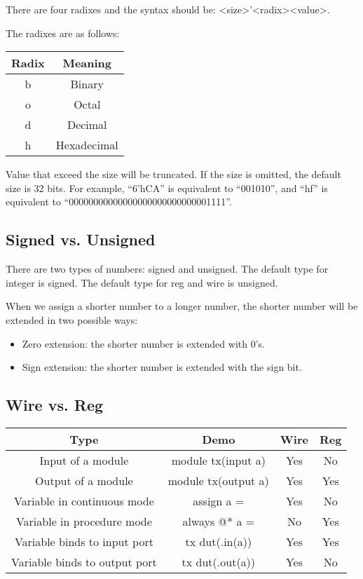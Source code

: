 \documentclass[a4paper,12pt]{article}
\begin{document}
There are four radixes and the syntax should be: <size>'<radix><value>.

The radixes are as follows:
\begin{center}
	\begin{tabular}{cc}
		\toprule
		Radix & Meaning \\
		\midrule
		b & Binary \\
		o & Octal \\
		d & Decimal \\
		h & Hexadecimal \\
		\bottomrule
	\end{tabular}
\end{center}

Value that exceed the size will be truncated.
If the size is omitted, the default size is 32 bits.
For example, ``6’hCA'' is equivalent to ``001010'', and ``hf'' is equivalent to ``00000000000000000000000000001111''.

\subsection{Signed vs. Unsigned}

There are two types of numbers: signed and unsigned.
The default type for integer is signed.
The default type for reg and wire is unsigned.

When we assign a shorter number to a longer number, the shorter number will be extended in two possible ways:
\begin{itemize}
	\item Zero extension: the shorter number is extended with 0's.
	\item Sign extension: the shorter number is extended with the sign bit.
\end{itemize}

\subsection{Wire vs. Reg}

\begin{center}
	\begin{tabular}{cccc}
		\toprule
		Type & Demo & Wire & Reg \\
		\midrule
		Input of a module & module tx(input a) & Yes & No \\
		Output of a module & module tx(output a) & Yes & Yes \\
		Variable in continuous mode & assign a =  & Yes & No \\
		Variable in procedure mode & always @* a = & No & Yes \\
		Variable binds to input port & tx dut(.in(a)) & Yes & Yes \\
		Variable binds to output port & tx dut(.out(a)) & Yes & No \\
		\bottomrule
	\end{tabular}
\end{center}
\end{document}
